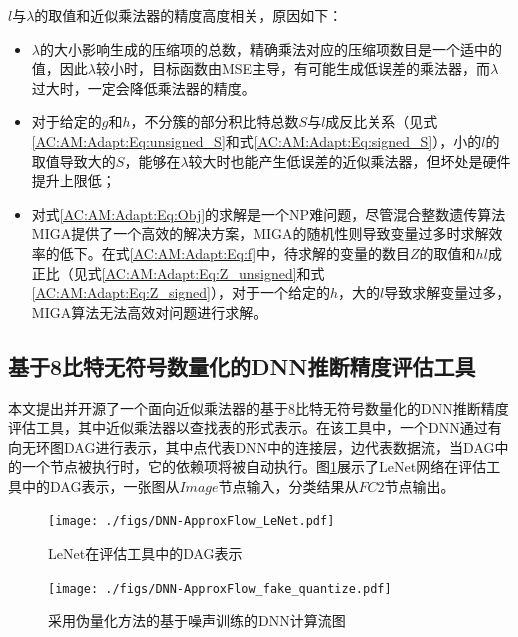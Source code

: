 $l$与$\lambda$的取值和近似乘法器的精度高度相关，原因如下：
\begin{itemize}
    \item $\lambda$的大小影响生成的压缩项的总数，精确乘法对应的压缩项数目是一个适中的值，因此$\lambda$较小时，目标函数由MSE主导，有可能生成低误差的乘法器，而$\lambda$过大时，一定会降低乘法器的精度。
    \item 对于给定的$g$和$h$，不分簇的部分积比特总数$S$与$l$成反比关系（见式\eqref{AC:AM:Adapt:Eq:unsigned_S}和式\eqref{AC:AM:Adapt:Eq:signed_S}），小的$l$的取值导致大的$S$，能够在$\lambda$较大时也能产生低误差的近似乘法器，但坏处是硬件提升上限低；
    \item 对式\eqref{AC:AM:Adapt:Eq:Obj}的求解是一个NP难问题，尽管混合整数遗传算法MIGA提供了一个高效的解决方案，MIGA的随机性则导致变量过多时求解效率的低下。在式\eqref{AC:AM:Adapt:Eq:f}中，待求解的变量的数目$Z$的取值和$hl$成正比（见式\eqref{AC:AM:Adapt:Eq:Z_unsigned}和式\eqref{AC:AM:Adapt:Eq:Z_signed}），对于一个给定的$h$，大的$l$导致求解变量过多，MIGA算法无法高效对问题进行求解。
\end{itemize}


\subsection{基于8比特无符号数量化的DNN推断精度评估工具}

本文提出并开源了一个面向近似乘法器的基于8比特无符号数量化的DNN推断精度评估工具，其中近似乘法器以查找表的形式表示。在该工具中，一个DNN通过有向无环图DAG进行表示，其中点代表DNN中的连接层，边代表数据流，当DAG中的一个节点被执行时，它的依赖项将被自动执行。图\ref{DNN:ApproxFlow:Fig:LeNet}展示了LeNet网络\cite{DNN:LeNet_MNIST}在评估工具中的DAG表示，一张图从$Image$节点输入，分类结果从$FC2$节点输出。

\begin{figure}[!ht]
    \centering
    \texttt{[image: ./figs/DNN-ApproxFlow\_LeNet.pdf]}
    \caption{LeNet在评估工具中的DAG表示}
    \label{DNN:ApproxFlow:Fig:LeNet}
\end{figure}

\begin{figure}[!ht]
    \centering
    \texttt{[image: ./figs/DNN-ApproxFlow\_fake\_quantize.pdf]}
    \caption{采用伪量化方法的基于噪声训练的DNN计算流图}
    \label{DNN:ApproxFlow:Fig:fake_quantize_noise}
\end{figure}

